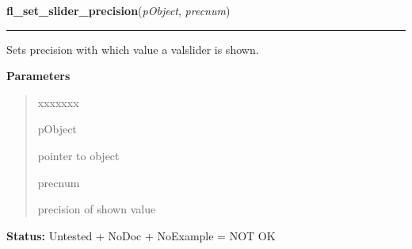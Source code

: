 \hspace{.8\funcindent}\begin{boxedminipage}{\funcwidth}

    \raggedright \textbf{fl\_set\_slider\_precision}(\textit{pObject}, \textit{precnum})

    \vspace{-1.5ex}

    \rule{\textwidth}{0.5\fboxrule}
\setlength{\parskip}{2ex}
    Sets precision with which value a valslider is shown.

\setlength{\parskip}{1ex}
      \textbf{Parameters}
      \vspace{-1ex}

      \begin{quote}
        \begin{Ventry}{xxxxxxx}

          \item[pObject]

          pointer to object

          \item[precnum]

          precision of shown value

        \end{Ventry}

      \end{quote}

\textbf{Status:} Untested + NoDoc + NoExample = NOT OK



    \end{boxedminipage}

    \label{xformslib:library:fl_set_slider_filter}

    \vspace{0.5ex}

